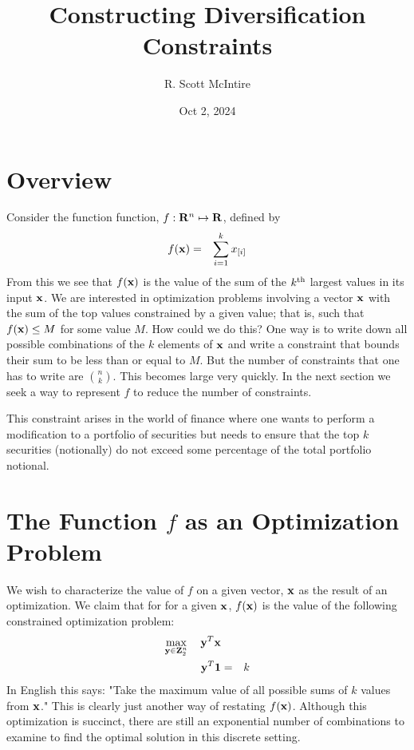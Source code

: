 \documentclass[12pt]{article}
\title{Constructing Diversification Constraints}
\author{R. Scott McIntire}
\date{Oct 2, 2024}
\begin{document}
\maketitle

\section{Overview}
Consider the function function, $f: {\bf R}^n \mapsto {\bf R}$, defined by
\begin{eqnarray}
	f({\bf x}) & = & \sum_{i=1}^k x_{[i]} 
\end{eqnarray}
From this we see that $f({\bf x})$ is the value of the sum of the $k^{\rm th}$ 
largest values in its input ${\bf x}$.
We are interested in optimization problems involving a vector ${\bf x}$ 
with the sum of the top values constrained by a given value; that is, 
such that $f({\bf x}) \le M$  for some value $M$.
How could we do this? One way is to write down all possible combinations of the 
$k$ elements of ${\bf x}$ and write a constraint that bounds their sum to be 
less than or equal to $M$.  But the number of constraints that one has to 
write are $n \choose k$. This becomes large very quickly. 
In the next section we seek a way to represent $f$ to 
reduce the number of constraints.

This constraint arises in the world of finance where one wants to perform
a modification to a portfolio of securities but needs to ensure that the 
top $k$ securities (notionally) do not exceed some percentage of the 
total portfolio notional.

\section{The Function $f$ as an Optimization Problem}
We wish to characterize the value of $f$ on a given vector, ${\bf x}$ as 
the result of an optimization.
We claim that for for a given ${\bf x}$, $f({\bf x})$ is the value of 
the following constrained optimization problem:
\begin{eqnarray}
\mathop{\rm max}_{{\bf y} \in {\bf Z}_2^n}\limits \quad {\bf y}^T {\bf x} && \\
{\bf y}^T {\bf 1} & = & k 
\end{eqnarray}
In English this says: "Take the maximum value of all possible sums of $k$ values from ${\bf x}$."
This is clearly just another way of restating $f({\bf x})$.
Although this optimization is succinct, there are still an exponential number of combinations 
to examine to find the optimal solution in this discrete setting.
\end{document}
